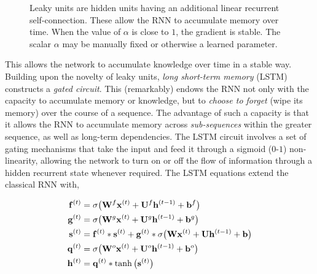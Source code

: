 \documentclass[11pt]{amsart}
\begin{document}
\begin{figure}
\centering
{}
\caption{Leaky units are hidden units having an additional linear recurrent self-connection. These allow the RNN to accumulate memory over time. When the value of $\alpha$ is close to $1$, the gradient is stable. The scalar $\alpha$ may be manually fixed or otherwise a learned parameter.}
\label{fig:rnn_leaky}
\end{figure}

This allows the network to accumulate knowledge over time in a stable way. Building upon the novelty of leaky units, \emph{long short-term memory} (LSTM) constructs a \emph{gated circuit}. This (remarkably) endows the RNN not only with the capacity to accumulate memory or knowledge, but to \emph{choose to forget} (wipe its memory) over the course of a sequence. The advantage of such a capacity is that it allows the RNN to accumulate memory across \emph{sub-sequences} within the greater sequence, as well as long-term dependencies. The LSTM circuit involves a set of gating mechanisms that take the input and feed it through a sigmoid ($0$-$1$) non-linearity, allowing the network to turn on or off the flow of information through a hidden recurrent state whenever required. The LSTM equations extend the classical RNN with,

\begin{align}
\mathbf{f}^{(t)} &= \sigma\big(\mathbf{W}^f\mathbf{x}^{(t)} + \mathbf{U}^f\mathbf{h}^{(t-1)} + \mathbf{b}^f\big) \notag \\
\mathbf{g}^{(t)} &= \sigma\big(\mathbf{W}^g\mathbf{x}^{(t)} + \mathbf{U}^g\mathbf{h}^{(t-1)} + \mathbf{b}^g\big) \notag \\
\mathbf{s}^{(t)} &= \mathbf{f}^{(t)} * \mathbf{s}^{(t)} + \mathbf{g}^{(t)} * \sigma\big(\mathbf{W}\mathbf{x}^{(t)} + \mathbf{U}\mathbf{h}^{(t-1)} + \mathbf{b}\big) \notag \\
\mathbf{q}^{(t)} &= \sigma\big(\mathbf{W}^o\mathbf{x}^{(t)} + \mathbf{U}^o\mathbf{h}^{(t-1)} + \mathbf{b}^o\big) \notag \\
\mathbf{h}^{(t)} &= \mathbf{q}^{(t)} * \tanh\big(\mathbf{s}^{(t)}\big) \notag
\end{align}
\end{document}
